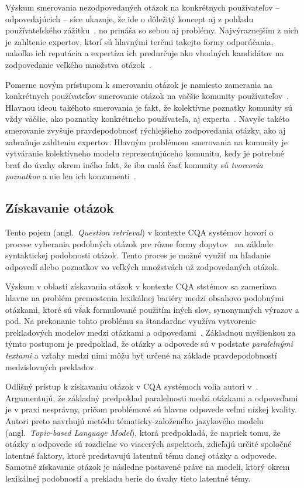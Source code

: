 Výskum smerovania nezodpovedaných otázok na konkrétnych používateľov -- odpovedajúcich -- síce ukazuje, že ide o dôležitý
koncept aj z pohľadu používateľského zážitku~\cite{Li2010,Li2011}, no prináša so sebou aj problémy. Najvýraznejším z nich je zahltenie
expertov, ktorí sú hlavnými terčmi takejto formy odporúčania, nakoľko ich reputácia a expertíza ich predurčuje ako vhodných
kandidátov na zodpovedanie veľkého množstva otázok~\cite{Pal2015}.

Pomerne novým prístupom k smerovaniu otázok je namiesto zamerania na konkrétnych používateľov smerovanie otázok na väčšie
komunity používateľov~\cite{Liu2014}. Hlavnou ideou takéhoto smerovania je fakt, že kolektívne poznatky komunity sú vždy väčšie, ako
poznatky konkrétneho používateľa, aj experta~\cite{Pal2013}. Navyše takéto smerovanie zvyšuje pravdepodobnosť rýchlejšieho zodpovedania
otázky, ako aj zabraňuje zahlteniu expertov. Hlavným problémom smerovania na komunity je vytváranie kolektívneho modelu
reprezentujúceho komunitu, kedy je potrebné brať do úvahy okrem iného fakt, že iba malá časť komunity sú \emph{tvorcovia
poznatkov} a nie len ich konzumenti~\cite{Pal2015}.


\subsection{Získavanie otázok}\label{q:retr}

Tento pojem (angl.~\emph{Question retrieval}) v kontexte CQA systémov hovorí o procese vyberania podobných otázok pre
rôzne formy dopytov~\cite{Zhang2014} na základe syntaktickej podobnosti otázok.
Tento proces je možné využiť na hľadanie odpovedí alebo poznatkov vo veľkých množstvách už zodpovedaných otázok.

Výskum v oblasti získavania otázok v kontexte CQA ststémov sa zameriava hlavne na problém premostenia lexikálnej bariéry medzi
obsahovo podobnými otázkami, ktoré sú však formulované použitím iných slov, synonymných výrazov a pod. Na prekonanie
tohto problému sa štandardne využíva vytvorenie prekladových modelov medzi otázkami a odpoveďami~\cite{Cao2010}.
Základnou myšlienkou za týmto postupom je predpoklad, že otázky a odpovede sú v podstate \emph{paralelnými textami}
a vzťahy medzi nimi môžu byť určené na základe pravdepodobností medzislovných prekladov.

Odlišný prístup k získavaniu otázok v CQA systémoch volia autori v~\cite{Zhang2014}. Argumentujú, že základný predpoklad
paralelnosti medzi otázkami a odpoveďami je v praxi nesprávny, pričom problémové sú hlavne odpovede veľmi nízkej kvality.
Autori preto navrhujú metódu tématicky-založeného jazykového modelu (angl.~\emph{Topic-based Language Model}), ktorá
predpokladá, že napriek tomu, že otázky a odpovede sú rozdielne vo viacerých aspektoch, zdieľajú určité
spoločné latentné faktory, ktoré predstavujú latentnú tému danej otázky a odpovede. Samotné získavanie otázok je následne
postavené práve na modeli, ktorý okrem lexikálnej podobnosti a prekladu berie do úvahy tieto latentné témy.


